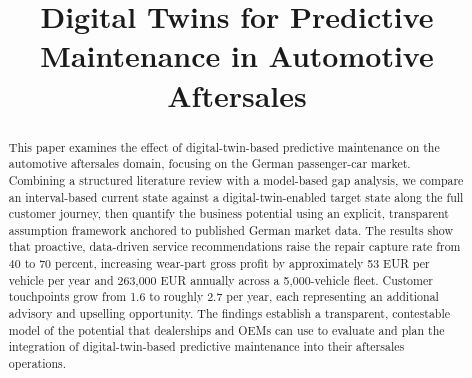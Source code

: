 \documentclass[conference,a4paper]{IEEEtran}
\begin{document}
\title{Digital Twins for Predictive Maintenance in Automotive Aftersales}

\author{
  \and
  \and
}

\maketitle

\begin{abstract}
This paper examines the effect of digital-twin-based predictive maintenance on the automotive aftersales domain, focusing on the German passenger-car market. Combining a structured literature review with a model-based gap analysis, we compare an interval-based current state against a digital-twin-enabled target state along the full customer journey, then quantify the business potential using an explicit, transparent assumption framework anchored to published German market data. The results show that proactive, data-driven service recommendations raise the repair capture rate from 40 to 70 percent, increasing wear-part gross profit by approximately 53 EUR per vehicle per year and 263,000 EUR annually across a 5,000-vehicle fleet. Customer touchpoints grow from 1.6 to roughly 2.7 per year, each representing an additional advisory and upselling opportunity. The findings establish a transparent, contestable model of the potential that dealerships and OEMs can use to evaluate and plan the integration of digital-twin-based predictive maintenance into their aftersales operations.
\end{abstract}
\end{document}
